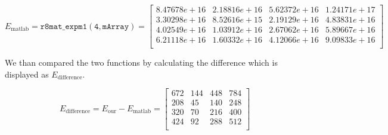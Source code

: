 \documentclass[paper=a4, fontsize=11pt]{article} %
\begin{document}
\[
E_{\text{matlab}} = \mathtt{r8mat\_{expm1}(4, mArray)} =
  \begin{bmatrix}
 8.47678e+16 & 2.18816e+16 & 5.62372e+16 & 1.24171e+17 \\
 3.30298e+16 & 8.52616e+15 & 2.19129e+16 & 4.83831e+16 \\
 4.02549e+16 & 1.03912e+16 & 2.67062e+16 & 5.89667e+16 \\
 6.21118e+16 & 1.60332e+16 & 4.12066e+16 & 9.09833e+16 \\
  \end{bmatrix}
\]

We than compared the two functions by calculating the difference which
is displayed as $E_{\text{difference}}$.


\[
  E_{\text{difference}} = E_{\text{our}} - E_{\text{matlab}} =
\begin{bmatrix}
 672 & 144 & 448 & 784 \\
 208 & 45 & 140 & 248 \\
 320 & 70 & 216 & 400 \\
 424 & 92 & 288 & 512 \\
\end{bmatrix}
\]
\end{document}
